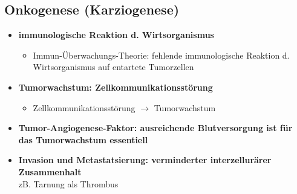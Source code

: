 	\subsection{Onkogenese (Karziogenese)}
		\begin{itemize}
			\item \textbf{immunologische Reaktion d. Wirtsorganismus}
				\begin{itemize}
					\item Immun-Überwachungs-Theorie: fehlende immunologische Reaktion d. Wirtsorganismus auf entartete Tumorzellen
				\end{itemize}
			\item \textbf{Tumorwachstum: Zellkommunikationsstörung}
				\begin{itemize}
					\item Zellkommunikationsstörung $\rightarrow$ Tumorwachstum
				\end{itemize}
			\item \textbf{Tumor-Angiogenese-Faktor: ausreichende Blutversorgung ist für das Tumorwachstum essentiell}
			\item \textbf{Invasion und Metastatsierung: verminderter interzellurärer Zusammenhalt}\\
				zB. Tarnung als Thrombus
		\end{itemize}
